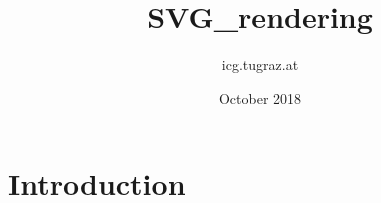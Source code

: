 \documentclass{article}
\title{SVG_rendering}
\author{icg.tugraz.at }
\date{October 2018}
\begin{document}
\maketitle

\section{Introduction}
\end{document}
